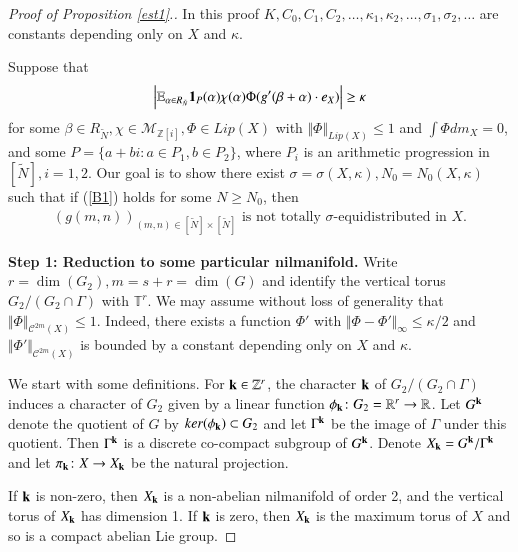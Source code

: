 \documentclass[12pt,amstex]{amsart}
\theoremstyle{definition}
\def \Z {\mathbb{Z}[i]}
\def \A {\alpha}
\def \B {\beta}
\def \D {\kappa}
\def \R {R_{\tilde{N}}}
\def \k {\bold{k}}
\begin{document}
\begin{proof}[Proof of Proposition \ref{est1}.]
In this proof $K,C_{0},C_{1},C_{2},\dots,\D_{1},\D_{2},\dots,\sigma_{1},\sigma_{2},\dots$ are constants depending only on $X$ and $\D$.

Suppose that
    \begin{equation}\label{B1}
  \begin{split}
    \Bigl\vert\mathbb{E}_{\A\in \R}\bold{1}_{P}(\A)\chi(\A)\Phi(g'(\B+\A)\cdot e_{X})\Bigr\vert\geq\D
  \end{split}
  \end{equation}
  for some $\B\in \R, \chi\in\mathcal{M}_{\Z}, \Phi\in Lip(X)$ with $\Vert\Phi\Vert_{Lip(X)}\leq 1$ and $\int\Phi dm_{X}=0$, and some $P=\{a+bi\colon a\in P_{1}, b\in P_{2}\}$, where $P_{i}$ is an arithmetic progression in $[\tilde{N}], i=1,2$. 
Our goal is to show there exist $\sigma=\sigma(X,\D), N_{0}=N_{0}(X,\D)$ such that if (\ref{B1}) holds for some $N\geq N_{0}$, then
  \begin{equation}\label{B2}
  \begin{split}
    (g(m,n))_{(m,n)\in[\tilde{N}]\times[\tilde{N}]} \text{ is not totally $\sigma$-equidistributed in $X$}.
  \end{split}
  \end{equation}

\textbf{Step 1: Reduction to some particular nilmanifold.}
 Write $r=\dim(G_{2}), m=s+r=\dim(G)$ and identify the vertical torus $G_{2}/(G_{2}\cap\Gamma)$ with $\mathbb{T}^{r}$.
We may assume without loss of generality that $\Vert\Phi\Vert_{\mathcal{C}^{2m}(X)}\leq 1$. Indeed,
there exists a function $\Phi'$ with $\Vert\Phi-\Phi'\Vert_{\infty}\leq \D/2$ and 
$\Vert\Phi'\Vert_{\mathcal{C}^{2m}(X)}$ is bounded by a constant depending only on $X$ and $\D$.

   We start with some definitions. For $\k\in\mathbb{Z}^{r}$, the character $\k$ of $G_{2}/(G_{2}\cap\Gamma)$
induces a character of $G_{2}$ given by a linear function $\phi_{\k}\colon G_{2}=\mathbb{R}^{r}\to\mathbb{R}$.
Let $G^{\k}$ denote the quotient of $G$ by $ker(\phi_{\k})\subset G_{2}$ and let $\Gamma^{\k}$ be the 
image of $\Gamma$ under this quotient. Then $\Gamma^{\k}$ is a discrete co-compact subgroup of $G^{\k}$.
Denote $X_{\k}=G^{\k}/\Gamma^{\k}$ and let $\pi_{\k}\colon X\to X_{\k}$ be the natural projection. 

If $\k$ is non-zero, then $X_{\k}$ is a non-abelian nilmanifold of order 2, and the vertical torus of $X_{\k}$ 
has dimension 1. If $\k$ is zero, then $X_{\k}$ is the maximum torus of $X$ and so is a compact abelian Lie group.



\end{proof}
\end{document}
